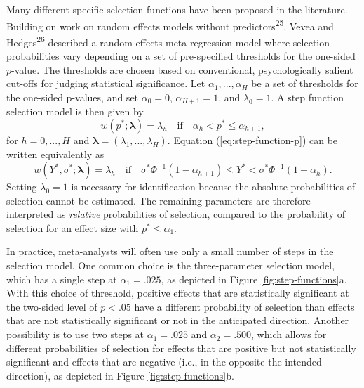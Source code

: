\documentclass[
  man, donotrepeattitle,floatsintext]{apa7}
\begin{document}
Many different specific selection functions have been proposed in the literature.
Building on work on random effects models without predictors\textsuperscript{25}, Vevea and Hedges\textsuperscript{26} described a random effects meta-regression model where selection probabilities vary depending on a set of pre-specified thresholds for the one-sided \(p\)-value.
The thresholds are chosen based on conventional, psychologically salient cut-offs for judging statistical significance.
Let \(\alpha_1,...,\alpha_H\) be a set of thresholds for the one-sided p-values, and set \(\alpha_0 = 0\), \(\alpha_{H+1} = 1\), and \(\lambda_0 = 1\).
A step function selection model is then given by
\begin{equation}
\label{eq:step-function-p}
w(p^*; \boldsymbol\lambda) =  \lambda_h \quad \text{if} \quad \alpha_{h} < p^* \leq \alpha_{h+1}, 
\end{equation}
for \(h = 0,...,H\) and \(\boldsymbol\lambda = \left(\lambda_1,...,\lambda_H\right)\).
Equation (\ref{eq:step-function-p}) can be written equivalently as
\begin{equation}
\label{eq:step-function-y}
w(Y^*, \sigma^*; \boldsymbol\lambda) =  \lambda_h \quad \text{if} \quad \sigma^* \Phi^{-1}\left(1 - \alpha_{h+1}\right) \leq Y^*  < \sigma^* \Phi^{-1}\left(1 - \alpha_h\right). 
\end{equation}
Setting \(\lambda_0 = 1\) is necessary for identification because the absolute probabilities of selection cannot be estimated.
The remaining parameters are therefore interpreted as \emph{relative} probabilities of selection, compared to the probability of selection for an effect size with \(p^* \leq \alpha_1\).

In practice, meta-analysts will often use only a small number of steps in the selection model.
One common choice is the three-parameter selection model, which has a single step at \(\alpha_1 = .025\), as depicted in Figure \ref{fig:step-functions}a.
With this choice of threshold, positive effects that are statistically significant at the two-sided level of \(p < .05\) have a different probability of selection than effects that are not statistically significant or not in the anticipated direction.
Another possibility is to use two steps at \(\alpha_1 = .025\) and \(\alpha_2 = .500\), which allows for different probabilities of selection for effects that are positive but not statistically significant and effects that are negative (i.e., in the opposite the intended direction), as depicted in Figure \ref{fig:step-functions}b.
\end{document}
